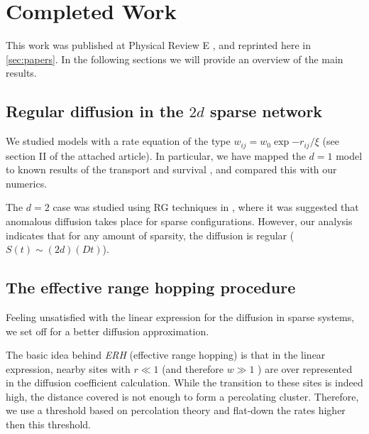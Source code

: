 \chapter{Completed Work}


This work was published at Physical Review E \cite{de_leeuw_diffusion_2012},
and reprinted here in \autoref{sec:papers}. In the
following sections we will provide an overview
of the main results.






\section{Regular diffusion in the $2d$ sparse network}

We studied models with a rate equation of the type $w_{ij}=w_0 \exp{-r_{ij}/\xi}$ 
(see section II of the attached article). In particular, we have mapped the
$d=1$ model to known results of the transport and survival \cite{alexander_excitation_1981},
and compared this with our numerics. 


The $d=2$ case was studied using RG techniques in \cite{amir_mean-field_2008,*amir_localization_2010}, 
where it was suggested that anomalous diffusion takes place for sparse configurations.
However, our analysis indicates that for any amount of sparsity,
the diffusion is regular ($S(t)\sim (2d)(Dt)$).

\section{The effective range hopping procedure}


Feeling unsatisfied with the linear expression for the diffusion
in sparse systems,
we set off for a better diffusion approximation.

The basic idea behind \emph{ERH} (effective range hopping) is that in the linear
expression, nearby sites 
with $r\ll 1$ (and therefore $w \gg 1$ ) are over represented in
the diffusion coefficient calculation. While the transition to
these sites is indeed high, the distance covered is not enough
to form a percolating cluster. Therefore, we use a threshold based
on percolation theory and flat-down the rates higher then this threshold.


